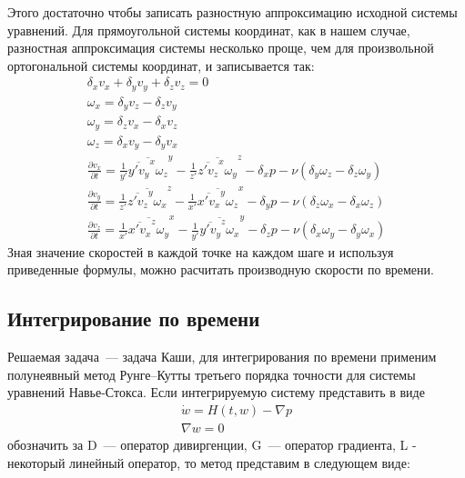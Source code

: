 Этого достаточно чтобы записать разностную аппроксимацию исходной системы уравнений. Для прямоугольной системы координат, как в нашем случае, разностная аппроксимация системы несколько проще, чем для произвольной ортогональной системы координат, и записывается так:
\begin{gather}
  \delta_x v_x + \delta_y v_y + \delta_z v_z = 0 
  \\
  \omega_x = \delta_y v_z - \delta_z v_y 
  \\
  \omega_y = \delta_z v_x - \delta_x v_z 
  \\
  \omega_z = \delta_x v_y - \delta_y v_x 
  \\
  \frac{\partial v_x}{\partial t} = \frac{1}{y'}\overline{\overline{y'v_y}^x \omega_z}^y - \frac{1}{z'}\overline{\overline{z'v_z}^x \omega_y}^z - \delta_x p - \nu (\delta_y \omega_z - \delta_z \omega_y)
  \\
  \frac{\partial v_y}{\partial t} = \frac{1}{z'}\overline{\overline{z'v_z}^y \omega_x}^z - \frac{1}{x'}\overline{\overline{x'v_x}^y \omega_z}^x - \delta_y p - \nu (\delta_z \omega_x - \delta_x \omega_z) 
  \\
  \frac{\partial v_z}{\partial t} = \frac{1}{x'}\overline{\overline{x'v_x}^z \omega_y}^x - \frac{1}{y'}\overline{\overline{y'v_y}^z \omega_x}^y - \delta_z p - \nu (\delta_x \omega_y - \delta_y \omega_x)
\end{gather}
Зная значение скоростей в каждой точке на каждом шаге и используя приведенные формулы, можно расчитать производную скорости по времени. 

\subsection{Интегрирование по времени}

Решаемая задача~--- задача Каши, для интегрирования по времени применим полунеявный метод Рунге--Кутты третьего порядка точности для системы уравнений Навье-Стокса.
Если интегрируемую систему представить в виде 
\begin{gather}
	\dot w = H(t,w) - \nabla p \\
	\nabla w = 0
\end{gather}
обозначить за D~--- оператор дивиргенции, G~--- оператор градиента, L - некоторый линейный оператор, то метод представим в следующем виде:

